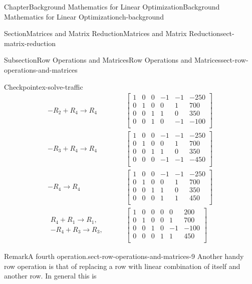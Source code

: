 \documentclass[oneside,10pt,]{book}
\numberwithin{equation}{section}
\newcommand{\amp}{&}
\begin{document}
\begin{chapterptx}{Chapter}{Background Mathematics for Linear Optimization}{}{Background Mathematics for Linear Optimization}{}{}{ch-background}
\begin{sectionptx}{Section}{Matrices and Matrix Reduction}{}{Matrices and Matrix Reduction}{}{}{sect-matrix-reduction}
\begin{subsectionptx}{Subsection}{Row Operations and Matrices}{}{Row Operations and Matrices}{}{}{sect-row-operations-and-matrices}
\begin{inlineexercise}{Checkpoint}{}{ex-solve-traffic}
\begin{align*}
-R_2 + R_4 \to R_4 \qquad \amp \left[\begin{array}{rrrrr|r} 1 \amp 0 \amp 0 \amp -1 \amp -1 \amp -250\\ 0 \amp 1 \amp 0 \amp 0 \amp 1 \amp 700\\ 0 \amp 0 \amp 1 \amp 1 \amp 0 \amp 350\\ 0 \amp 0 \amp 1 \amp 0 \amp -1 \amp -100\\ \end{array} \right] \\
-R_3 + R_4 \to R_4 \qquad \amp \left[\begin{array}{rrrrr|r} 1 \amp 0 \amp 0 \amp -1 \amp -1 \amp -250\\ 0 \amp 1 \amp 0 \amp 0 \amp 1 \amp 700\\ 0 \amp 0 \amp 1 \amp 1 \amp 0 \amp 350\\ 0 \amp 0 \amp 0 \amp -1 \amp -1 \amp -450\\ \end{array} \right] \\
-R_4 \to R_4 \qquad \amp \left[\begin{array}{rrrrr|r} 1 \amp 0 \amp 0 \amp -1 \amp -1 \amp -250\\ 0 \amp 1 \amp 0 \amp 0 \amp 1 \amp 700\\ 0 \amp 0 \amp 1 \amp 1 \amp 0 \amp 350\\ 0 \amp 0 \amp 0 \amp 1 \amp 1 \amp 450\\ \end{array} \right] \\
\begin{array}{r} R_4 + R_1 \to R_1, \\ -R_4 + R_3\to R_3, \end{array} \qquad \amp \left[\begin{array}{rrrrr|r} 1 \amp 0 \amp 0 \amp 0 \amp 0 \amp 200\\ 0 \amp 1 \amp 0 \amp 0 \amp 1 \amp 700\\ 0 \amp 0 \amp 1 \amp 0 \amp -1 \amp -100\\ 0 \amp 0 \amp 0 \amp 1 \amp 1 \amp 450\\ \end{array} \right]
\end{align*}
%
\end{inlineexercise}%
\begin{remark}{Remark}{A fourth operation.}{sect-row-operations-and-matrices-9}%
Another handy row operation is that of replacing a row with linear combination of itself and another row. In general this is%

\end{remark}
\end{subsectionptx}
\end{sectionptx}
\end{chapterptx}
\end{document}
